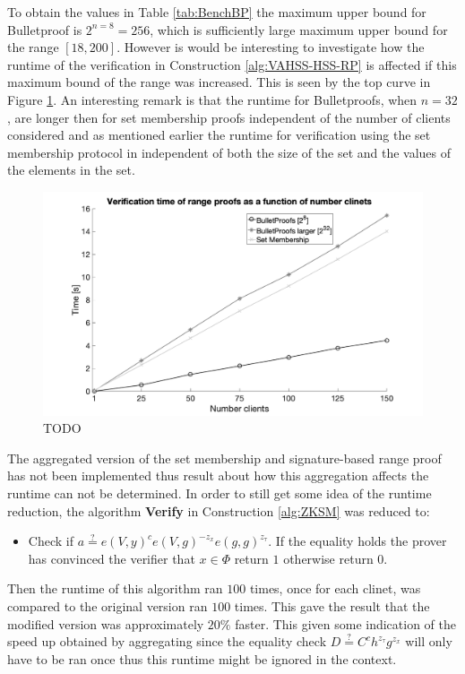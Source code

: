 To obtain the values in Table \ref{tab:BenchBP} the maximum upper bound for Bulletproof is $2^{n=8}=256$, which  is sufficiently large maximum upper bound  for the range $[18,200]$. However is would be interesting to investigate how the runtime of the verification in Construction \ref{alg:VAHSS-HSS-RP} is affected if this maximum bound of the range was increased. This is seen by the top curve in Figure \ref{fig:NrClients}. 
 An interesting remark is that  the runtime for Bulletproofs, when $n=32$, are longer then for set membership proofs independent of the number of clients considered and as mentioned earlier the runtime for verification using the set membership protocol in independent of both the size of the set and the values of the elements in the set. 
 \begin{figure}[]
\caption{TODO}
\label{fig:NrClients}
\includegraphics[width=\linewidth]{./figure/verification_nrClients.png}
\end{figure}

The aggregated version of the set membership and signature-based range proof has not been implemented thus result about how this aggregation affects the runtime can not be determined. In order to still get some idea of the runtime reduction, the algorithm \textbf{Verify} in Construction \ref{alg:ZKSM} was reduced to: 
\begin{itemize}
\item{}
Check if $a \overset{?}{=} e(V,y)^c e(V,g)^{-z_x}e(g,g)^{z_\tau}$. If the equality holds the prover has convinced the verifier that $x\in\Phi$ return $1$ otherwise return $0$.
\end{itemize}
Then the runtime of this algorithm ran $100$ times, once for each clinet, was compared to the original version ran $100$ times. This gave the result that the modified version was approximately $20\%$ faster. This given some indication of the speed up obtained by aggregating since the equality check $D\overset{?}{=} C^ch^{z_\tau}g^{z_x}$ will only have to be ran once thus this runtime might be ignored in the context. 
